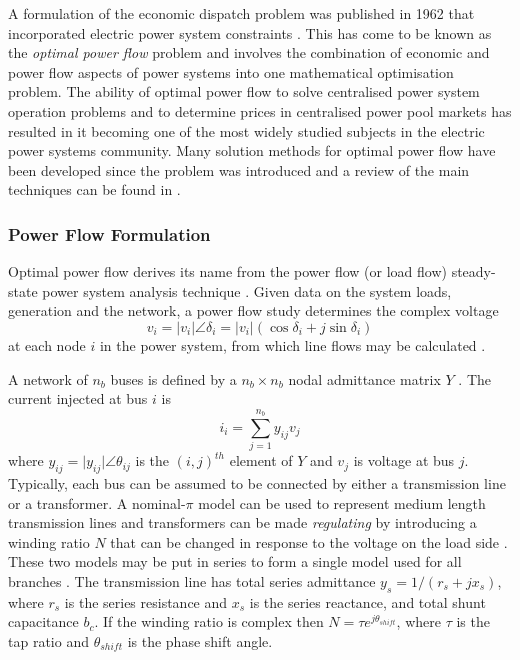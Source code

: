 A formulation of the economic dispatch problem was published in 1962 that
incorporated electric power system constraints \cite{carpentier:opf}. This has
come to be known as the \textit{optimal power flow} problem and involves the
combination of economic and power flow aspects of power systems into one
mathematical optimisation problem.  The ability of optimal power flow to solve
centralised power system operation problems and to determine prices in
centralised power pool markets has resulted in it becoming one of the most
widely studied subjects in the electric power systems community.  Many solution
methods for optimal power flow have been developed since the problem was
introduced and a review of the main techniques can be found in
.

\subsubsection{Power Flow Formulation}
\label{sec:pf_form}
Optimal power flow derives its name from the power flow (or load flow)
steady-state power system analysis technique \cite[\S18]{kallrath:2009}.  Given
data on the system loads, generation and the network, a power flow study
determines the complex voltage
\begin{equation}
\label{eq:ybus}
v_i = \vert v_i \vert \angle\delta_i = \vert
v_i\vert(\cos\delta_i + j\sin\delta_i)
\end{equation}
at each node $i$ in the power system, from which line flows may be calculated
\cite{wood:pgoc}.

A network of $n_b$ buses is defined by a $n_b \times n_b$ nodal admittance
matrix $Y$ \cite{wood:pgoc,gloversarma:psad}.  The current injected at bus $i$ is
\begin{equation}
i_i = \sum_{j=1}^{n_b} y_{ij} v_j
\end{equation}
where $y_{ij} = \vert y_{ij}\vert \angle\theta_{ij}$ is the $(i,j)^{th}$
element of $Y$ and $v_j$ is voltage at bus $j$.
Typically, each bus can be assumed to be connected by either a transmission line
or a transformer. A nominal-$\pi$ model can be used to represent medium length
transmission lines \cite{grainger:psa} and transformers can be made
\textit{regulating} by introducing a winding ratio $N$ that can be changed in
response to the voltage on the load side \cite{crow:2009}. These two models may
be put in series to form a single model used for all branches
\cite[p.11]{pserc:mp_manual}. The transmission line has total series admittance
$y_s = 1/(r_s+jx_s)$, where $r_s$ is the series resistance and $x_s$ is the
series reactance, and total shunt capacitance $b_c$. If the winding ratio is
complex then $N = \tau e^{j\theta_{shift}}$, where $\tau$ is the tap ratio and
$\theta_{shift}$ is the phase shift angle.

